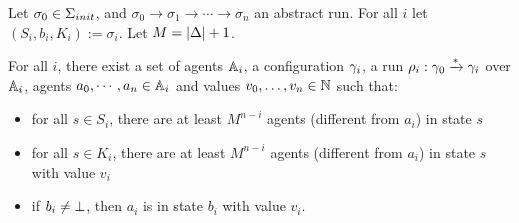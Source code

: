 %	
%	
%	
%	
%	
%	


\begin{lemma}
	\label{lem:correctness-construction}
	Let $\sigma_0 \in \aconfiginitset$, and $\sigma_0 \to \sigma_1 \to \cdots \to \sigma_n$ an abstract run. For all $i$ let $(S_i, b_i, K_i) := \sigma_i$. Let $M = |\Delta|+1$.
	
	For all $i$, there exist a set of agents $\mathbb{A}_i$, a configuration $\gamma_i$, a run $\rho_i : \gamma_0 \xrightarrow{*} \gamma_i$ over $\mathbb{A}_i$, agents $a_0, \cdots, a_n \in \mathbb{A}_i$ and values $v_0, \ldots, v_n \in \mathbb{N}$ such that:
	\begin{itemize}
		\item for all $s \in S_i$, there are at least $M^{n-i}$ agents (different from $a_i$) in state $s$ 
		
		\item for all $s \in K_i$, there are at least $M^{n-i}$ agents (different from $a_i$) in state $s$ with value $v_i$
		
		\item if $b_i \neq \bot$, then $a_i$ is in state $b_i$ with value $v_i$.
	\end{itemize}
\end{lemma}

